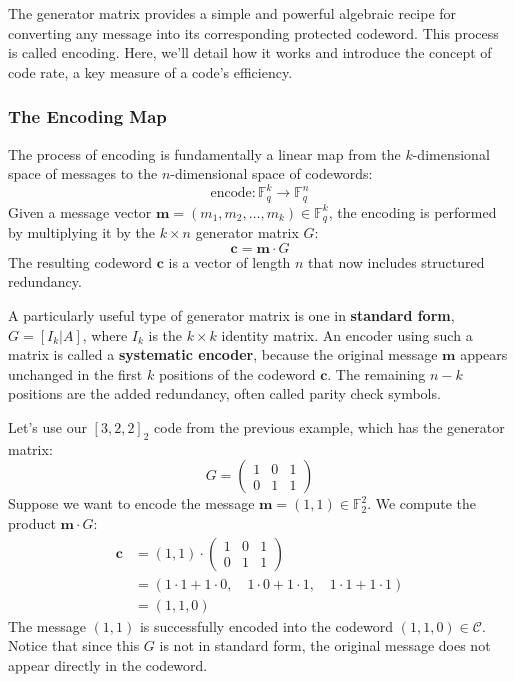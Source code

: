 \documentclass{article}
\begin{document}
The generator matrix provides a simple and powerful algebraic recipe for converting any message into its corresponding protected codeword. This process is called encoding. Here, we'll detail how it works and introduce the concept of code rate, a key measure of a code's efficiency.

\subsubsection{The Encoding Map}
The process of encoding is fundamentally a linear map from the $k$-dimensional space of messages to the $n$-dimensional space of codewords:
$$
\text{encode}: \mathbb{F}_q^k \to \mathbb{F}_q^n
$$
Given a message vector $\mathbf{m} = (m_1, m_2, \dots, m_k) \in \mathbb{F}_q^k$, the encoding is performed by multiplying it by the $k \times n$ generator matrix $G$:
$$
\mathbf{c} = \mathbf{m} \cdot G
$$
The resulting codeword $\mathbf{c}$ is a vector of length $n$ that now includes structured redundancy.

A particularly useful type of generator matrix is one in \textbf{standard form}, $G = [I_k | A]$, where $I_k$ is the $k \times k$ identity matrix. An encoder using such a matrix is called a \textbf{systematic encoder}, because the original message $\mathbf{m}$ appears unchanged in the first $k$ positions of the codeword $\mathbf{c}$. The remaining $n-k$ positions are the added redundancy, often called parity check symbols.

\begin{tcolorbox}[title={Example: Encoding a Single Message}]
Let's use our $[3, 2, 2]_2$ code from the previous example, which has the generator matrix:
\[
G = \begin{pmatrix} 1 & 0 & 1 \\ 0 & 1 & 1 \end{pmatrix}
\]
Suppose we want to encode the message $\mathbf{m} = (1, 1) \in \mathbb{F}_2^2$. We compute the product $\mathbf{m} \cdot G$:
\begin{align*}
\mathbf{c} &= (1, 1) \cdot \begin{pmatrix} 1 & 0 & 1 \\ 0 & 1 & 1 \end{pmatrix} \\
&= (1 \cdot 1 + 1 \cdot 0, \quad 1 \cdot 0 + 1 \cdot 1, \quad 1 \cdot 1 + 1 \cdot 1) \\
&= (1, 1, 0)
\end{align*}
The message $(1, 1)$ is successfully encoded into the codeword $(1, 1, 0) \in \mathcal{C}$. Notice that since this $G$ is not in standard form, the original message does not appear directly in the codeword.
\end{tcolorbox}
\end{document}
